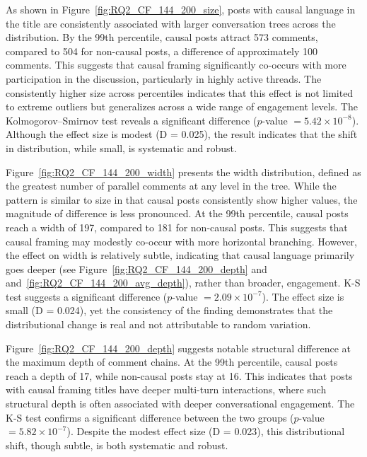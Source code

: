 \documentclass[acmsmall]{acmart}
\begin{document}
As shown in Figure~\ref{fig:RQ2_CF_144_200_size}, posts with causal language in the title are consistently associated with larger conversation trees across the distribution. By the 99th percentile, causal posts attract 573 comments, compared to 504 for non-causal posts, a difference of approximately 100 comments. This suggests that causal framing significantly co-occurs with more participation in the discussion, particularly in highly active threads. The consistently higher size across percentiles indicates that this effect is not limited to extreme outliers but generalizes across a wide range of engagement levels. The Kolmogorov–Smirnov test reveals a significant difference ($p$-value $=5.42 \times 10^{-8}$). Although the effect size is modest (D = 0.025), the result indicates that the shift in distribution, while small, is systematic and robust.

Figure~\ref{fig:RQ2_CF_144_200_width} presents the width distribution, defined as the greatest number of parallel comments at any level in the tree. While the pattern is similar to size in that causal posts consistently show higher values, the magnitude of difference is less pronounced. At the 99th percentile, causal posts reach a width of 197, compared to 181 for non-causal posts. This suggests that causal framing may modestly co-occur with more horizontal branching. However, the effect on width is relatively subtle, indicating that causal language primarily goes deeper (see Figure~\ref{fig:RQ2_CF_144_200_depth} and and~\ref{fig:RQ2_CF_144_200_avg_depth}), rather than broader, engagement. K-S test suggests a significant difference ($p$-value $= 2.09 \times 10^{-7}$). The effect size is small (D = 0.024), yet the consistency of the finding demonstrates that the distributional change is real and not attributable to random variation.









Figure~\ref{fig:RQ2_CF_144_200_depth} suggests notable structural difference at the maximum depth of comment chains. At the 99th percentile, causal posts reach a depth of 17, while non-causal posts stay at 16. This indicates that posts with causal framing titles have deeper multi-turn interactions, where such structural depth is often associated with deeper conversational engagement. The K-S test confirms a significant difference between the two groups ($p$-value $=5.82 \times 10^{-7}$). Despite the modest effect size (D = 0.023), this distributional shift, though subtle, is both systematic and robust.
\end{document}
